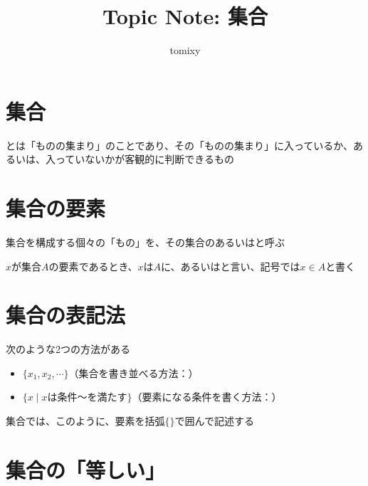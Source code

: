 \documentclass[b5paper,12pt]{jsarticle}
\title{Topic Note: 集合}
\author{tomixy}
\begin{document}
\maketitle
\tableofcontents

\sectionline
\section{集合}

とは「ものの集まり」のことであり、その「ものの集まり」に入っているか、あるいは、入っていないかが客観的に判断できるもの

\sectionline
\section{集合の要素}

集合を構成する個々の「もの」を、その集合のあるいはと呼ぶ

\br

$x$が集合$A$の要素であるとき、$x$は$A$に、あるいはと言い、記号では$x \in A$と書く

\sectionline
\section{集合の表記法}

次のような2つの方法がある
\begin{itemize}
  \item $\{x_1, x_2, \cdots \}$（集合を書き並べる方法：）
  \item $\{x \mid x \text{は条件〜を満たす}\}$（要素になる条件を書く方法：）
\end{itemize}

集合では、このように、要素を括弧$\{\}$で囲んで記述する

\sectionline
\section{集合の「等しい」}

集合$A$と集合$B$がとは、
\begin{shaded}
  $A$の要素がすべて$B$の要素であり、かつ、$B$の要素がすべて$A$の要素である
\end{shaded}
ことを言う

集合$A$と集合$B$が等しいとき、$A = B$と書く

\sectionline
\section{有限集合と無限集合}
\end{document}
